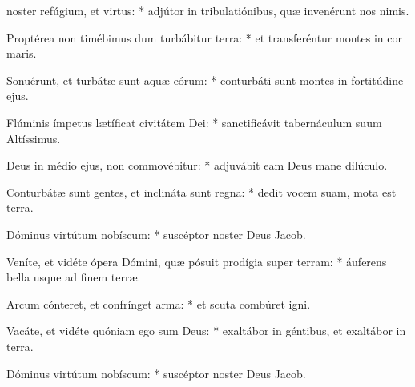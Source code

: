 \begin{psalmus}

     noster refúgium, et virtus: * adjútor in tribulatiónibus, quæ invenérunt nos nimis.

    Proptérea non timébimus dum turbábitur terra: * et transferéntur montes in cor maris.

    Sonuérunt, et turbátæ sunt aquæ eórum: * conturbáti sunt montes in fortitúdine ejus.

    Flúminis ímpetus lætíficat civitátem Dei: * sanctificávit tabernáculum suum Altíssimus.

    Deus in médio ejus, non commovébitur: * adjuvábit eam Deus mane dilúculo.

    Conturbátæ sunt gentes, et inclináta sunt regna: * dedit vocem suam, mota est terra.

    Dóminus virtútum nobíscum: * suscéptor noster Deus Jacob.

    Veníte, et vidéte ópera Dómini, quæ pósuit prodígia super terram: * áuferens bella usque ad finem terræ.

    Arcum cónteret, et confrínget arma: * et scuta combúret igni.

    Vacáte, et vidéte quóniam ego sum Deus: * exaltábor in géntibus, et exaltábor in terra.

    Dóminus virtútum nobíscum: * suscéptor noster Deus Jacob.

\end{psalmus}
